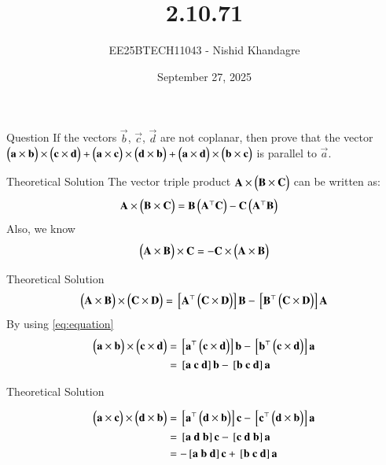 \documentclass{beamer}
\title
{2.10.71}
\date{September 27, 2025}
\author
{EE25BTECH11043 - Nishid Khandagre}
\begin{document}
\frame{\titlepage}

\begin{frame}{Question}
If the vectors $\vec{b}$, $\vec{c}$, $\vec{d}$ are not coplanar, then prove that the vector
$\begin{pmatrix}\mathbf{a} \times\mathbf{b}\end{pmatrix} \times\begin{pmatrix}\mathbf{c} \times\mathbf{d}\end{pmatrix} + \begin{pmatrix}\mathbf{a} \times\mathbf{c}\end{pmatrix} \times\begin{pmatrix}\mathbf{d} \times\mathbf{b}\end{pmatrix} + \begin{pmatrix}\mathbf{a} \times\mathbf{d}\end{pmatrix} \times\begin{pmatrix}\mathbf{b} \times\mathbf{c}\end{pmatrix}$
is parallel to $\vec{a}$.
\end{frame}

\begin{frame}{Theoretical Solution}
The vector triple product $\mathbf{A} \times \begin{pmatrix}\mathbf{B} \times \mathbf{C}\end{pmatrix}$ can be written as:
\begin{align}
\mathbf{A} \times \begin{pmatrix}\mathbf{B} \times \mathbf{C}\end{pmatrix} &= \mathbf{B}\begin{pmatrix}\mathbf{A}^\top \mathbf{C}\end{pmatrix} - \mathbf{C}\begin{pmatrix}\mathbf{A}^\top \mathbf{B}\end{pmatrix}
\end{align}
Also, we know
\begin{align}
\begin{pmatrix}\mathbf{A} \times \mathbf{B}\end{pmatrix} \times \mathbf{C} = - \mathbf{C} \times \begin{pmatrix}\mathbf{A} \times \mathbf{B}\end{pmatrix}
\end{align}
\end{frame}

\begin{frame}{Theoretical Solution}
\begin{align}
\begin{pmatrix}\mathbf{A} \times \mathbf{B}\end{pmatrix} \times \begin{pmatrix}\mathbf{C} \times \mathbf{D}\end{pmatrix} = {}\left[\mathbf{A}^\top \begin{pmatrix}\mathbf{C} \times \mathbf{D}\end{pmatrix}\right] \mathbf{B} - {}\left[\mathbf{B}^\top \begin{pmatrix}\mathbf{C} \times \mathbf{D}\end{pmatrix}\right] \mathbf{A}
\label{eq:equation}
\end{align}
By using \eqref{eq:equation}
\begin{align}
\myvec{\vec{a} \times\vec{b}}\times \myvec{\vec{c} \times\vec{d}}&= \sbrak{\vec{a}^\top \myvec{\vec{c} \times \vec{d}}} \vec{b} - \sbrak{\vec{b}^\top \myvec{\vec{c} \times \vec{d}}} \vec{a}\\
&=\sbrak{\vec{a} \ \vec{c} \ \vec{d}}\vec{b} - \sbrak{\vec{b} \ \vec{c} \ \vec{d}}\vec{a}
\end{align}
\end{frame}

\begin{frame}{Theoretical Solution}

\begin{align}
\myvec{\vec{a} \times\vec{c}} \times\myvec{\vec{d} \times\vec{b}}&=
\sbrak{\vec{a}^\top \myvec{\vec{d} \times \vec{b}}} \vec{c} - \sbrak{\vec{c}^\top \myvec{\vec{d} \times \vec{b}}} \vec{a}\\
&= \sbrak{\vec{a} \ \vec{d} \ \vec{b}}\vec{c} - \sbrak{\vec{c} \ \vec{d} \ \vec{b}}\vec{a} \\
&= -\sbrak{\vec{a} \ \vec{b} \ \vec{d}}\vec{c} + \sbrak{\vec{b} \ \vec{c} \ \vec{d}}\vec{a}
\end{align}
\end{frame}
\end{document}
